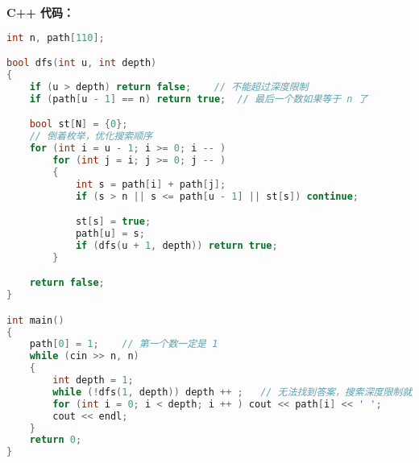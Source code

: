 \textbf{C++ 代码：}

\begin{lstlisting}[language=cpp]
int n, path[110];

bool dfs(int u, int depth)
{
    if (u > depth) return false;    // 不能超过深度限制
    if (path[u - 1] == n) return true;  // 最后一个数如果等于 n 了

    bool st[N] = {0};
    // 倒着枚举，优化搜索顺序
    for (int i = u - 1; i >= 0; i -- )
        for (int j = i; j >= 0; j -- )
        {
            int s = path[i] + path[j];
            if (s > n || s <= path[u - 1] || st[s]) continue;

            st[s] = true;
            path[u] = s;
            if (dfs(u + 1, depth)) return true;
        }

    return false;
}

int main()
{
    path[0] = 1;    // 第一个数一定是 1
    while (cin >> n, n)
    {
        int depth = 1;
        while (!dfs(1, depth)) depth ++ ;   // 无法找到答案，搜索深度限制就加一
        for (int i = 0; i < depth; i ++ ) cout << path[i] << ' ';
        cout << endl;
    }
    return 0;
}
\end{lstlisting}